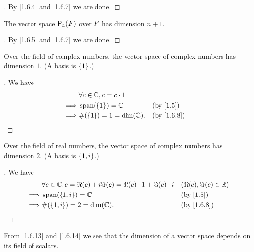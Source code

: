 \begin{proof}[]
	By \cref{1.6.4} and \cref{1.6.7} we are done.
\end{proof}

\begin{eg}\label{1.6.12}
	The vector space \(\ps[n]{\F}\) over \(\mathit{F}\) has dimension \(n + 1\).
\end{eg}

\begin{proof}[]
	By \cref{1.6.5} and \cref{1.6.7} we are done.
\end{proof}

\begin{eg}\label{1.6.13}
	Over the field of complex numbers, the vector space of complex numbers has dimension \(1\).
	(A basis is \(\left\lbrace1\right\rbrace\).)
\end{eg}

\begin{proof}[]
	We have
	\begin{align*}
		         & \forall c \in \C, c = c \cdot 1                 \\
		\implies & \spn{\set{1}} = \C              &  & \by{1.5}   \\
		\implies & \#\pa{\set{1}} = 1 = \dim(\C).  &  & \by{1.6.8}
	\end{align*}
\end{proof}

\begin{eg}\label{1.6.14}
	Over the field of real numbers, the vector space of complex numbers has dimension \(2\).
	(A basis is \(\left\lbrace1, i\right\rbrace\).)
\end{eg}

\begin{proof}[]
	We have
	\begin{align*}
		         & \forall c \in \C, c = \Re(c) + i \Im(c) = \Re(c) \cdot 1 + \Im(c) \cdot i &  & (\Re(c), \Im(c) \in \R) \\
		\implies & \spn{\set{1, i}} = \C                                                     &  & \by{1.5}                \\
		\implies & \#\pa{\set{1, i}} = 2 = \dim(\C).                                         &  & \by{1.6.8}
	\end{align*}
\end{proof}

\begin{note}
	From \cref{1.6.13} and \cref{1.6.14} we see that the dimension of a vector space depends on its field of scalars.
\end{note}

